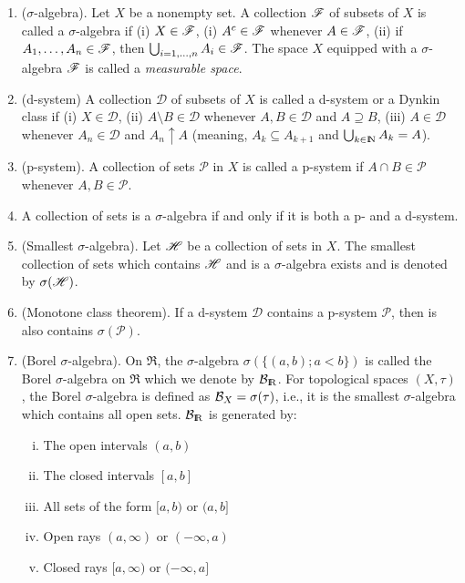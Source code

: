 \documentclass[a4paper,10pt]{article}
\begin{document}
\begin{enumerate}
 \item ($\sigma$-algebra). Let $X$ be a nonempty set. A collection $\mathscr{F}$ of subsets of $X$
       is called a $\sigma$-algebra if (i) $X \in \mathscr{F}$, (i) $A^c\in\mathscr{F}$ whenever $A\in\mathscr{F}$,
       (ii) if $A_1,\ldots, A_n\in\mathscr{F}$, then $\bigcup_{i=1,\ldots,n}A_i\in\mathscr{F}$. The space $X$
       equipped with a $\sigma$-algebra $\mathscr{F}$ is called a \textit{measurable space}.
       
 \item (d-system) A collection $\mathcal{D}$ of subsets of $X$ is called a d-system or a Dynkin class if 
       (i) $X\in\mathcal{D}$,
       (ii) $A\setminus B\in\mathcal{D}$ whenever $A,B\in\mathcal{D}$ and $A\supseteq B$,
       (iii) $A\in\mathcal{D}$ whenever $A_n\in \mathcal{D}$ and $A_n \uparrow A$ (meaning, 
       $A_{k}\subseteq A_{k+1}$ and $\bigcup_{k\in\N}A_k=A$).
       
 \item (p-system). A collection of sets $\mathcal{P}$ in $X$ is called a p-system
       if $A\cap B\in \mathcal{P}$ whenever $A,B\in\mathcal{P}$.
       
 \item A collection of sets is a $\sigma$-algebra if and only if it is both a p- and a d-system.
 
 \item (Smallest $\sigma$-algebra). Let $\mathscr{H}$ be a collection of sets in $X$. The smallest collection of sets
       which contains $\mathscr{H}$ and is a $\sigma$-algebra exists and is denoted by $\sigma(\mathscr{H})$.
 
 \item (Monotone class theorem). If a d-system $\mathcal{D}$ contains a p-system $\mathcal{P}$, then is also contains $\sigma(\mathcal{P})$.
 
 \item \label{mps1311949}
       (Borel $\sigma$-algebra). On $\Re$, the $\sigma$-algebra $\sigma(\{(a,b); a<b\})$ is called the Borel $\sigma$-algebra on $\Re$
       which we denote by $\B_\Re$. For topological spaces $(X,\tau)$, the Borel $\sigma$-algebra is
       defined as $\mathcal{B}_X = \sigma(\tau)$, i.e., it is the smallest $\sigma$-algebra which contains
       all open sets. $\B_\Re$ is generated by:
       \begin{enumerate}[(i)]
        \item The open intervals $(a,b)$
        \item The closed intervals $[a,b]$
        \item All sets of the form $[a,b)$ or $(a,b]$
        \item Open rays $(a,\infty)$ or $(-\infty,a)$
        \item Closed rays $[a,\infty)$ or $(-\infty,a]$
       \end{enumerate}            


\end{enumerate}
\end{document}
